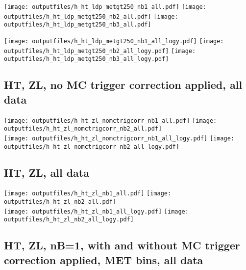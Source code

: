 \documentclass[11pt]{article}
\begin{document}
    \noindent
     \texttt{[image: outputfiles/h\_ht\_ldp\_metgt250\_nb1\_all.pdf]}
     \texttt{[image: outputfiles/h\_ht\_ldp\_metgt250\_nb2\_all.pdf]}
     \texttt{[image: outputfiles/h\_ht\_ldp\_metgt250\_nb3\_all.pdf]}

    \noindent
     \texttt{[image: outputfiles/h\_ht\_ldp\_metgt250\_nb1\_all\_logy.pdf]}
     \texttt{[image: outputfiles/h\_ht\_ldp\_metgt250\_nb2\_all\_logy.pdf]}
     \texttt{[image: outputfiles/h\_ht\_ldp\_metgt250\_nb3\_all\_logy.pdf]}


     \subsection{ HT, ZL, no MC trigger correction applied, all data}

    \noindent
     \texttt{[image: outputfiles/h\_ht\_zl\_nomctrigcorr\_nb1\_all.pdf]}
     \texttt{[image: outputfiles/h\_ht\_zl\_nomctrigcorr\_nb2\_all.pdf]} \\

    \noindent
     \texttt{[image: outputfiles/h\_ht\_zl\_nomctrigcorr\_nb1\_all\_logy.pdf]}
     \texttt{[image: outputfiles/h\_ht\_zl\_nomctrigcorr\_nb2\_all\_logy.pdf]}


     \subsection{ HT, ZL, all data}

    \noindent
     \texttt{[image: outputfiles/h\_ht\_zl\_nb1\_all.pdf]}
     \texttt{[image: outputfiles/h\_ht\_zl\_nb2\_all.pdf]} \\

    \noindent
     \texttt{[image: outputfiles/h\_ht\_zl\_nb1\_all\_logy.pdf]}
     \texttt{[image: outputfiles/h\_ht\_zl\_nb2\_all\_logy.pdf]}


   \clearpage
     \subsection{ HT, ZL, nB=1, with and without MC trigger correction applied, MET bins, all data}
\end{document}
